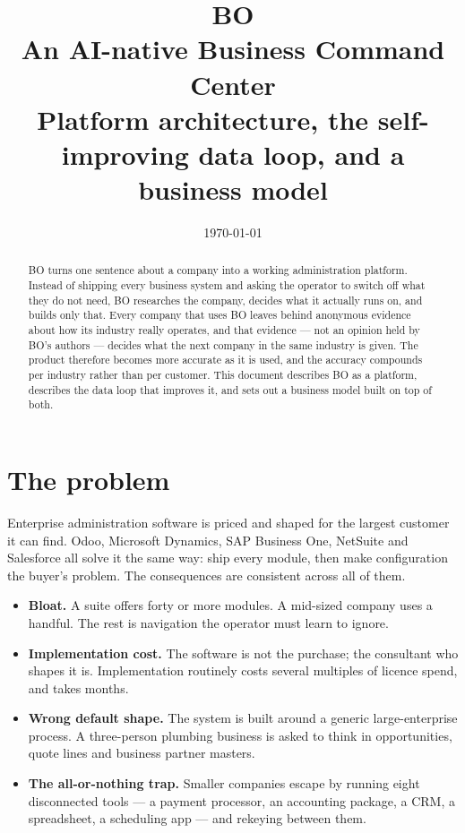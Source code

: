 \documentclass[11pt,a4paper]{article}
\title{\vspace{-1.5cm}\textbf{\Huge BO}\\[0.4em]
  \large An AI-native Business Command Center\\[0.25em]
  \normalsize\color{bomuted}Platform architecture, the self-improving data loop, and a business model}
\author{}
\date{\small\today}
\begin{document}
\maketitle
\thispagestyle{fancy}

\begin{abstract}
\noindent
BO turns one sentence about a company into a working administration platform. Instead of shipping
every business system and asking the operator to switch off what they do not need, BO researches the
company, decides what it actually runs on, and builds only that. Every company that uses BO leaves
behind anonymous evidence about how its industry really operates, and that evidence --- not an
opinion held by BO's authors --- decides what the next company in the same industry is given. The
product therefore becomes more accurate as it is used, and the accuracy compounds per industry
rather than per customer. This document describes BO as a platform, describes the data loop that
improves it, and sets out a business model built on top of both.
\end{abstract}

\section{The problem}

Enterprise administration software is priced and shaped for the largest customer it can find. Odoo,
Microsoft Dynamics, SAP Business One, NetSuite and Salesforce all solve it the same way: ship every
module, then make configuration the buyer's problem. The consequences are consistent across all of
them.

\begin{itemize}[leftmargin=1.4em,itemsep=2pt]
  \item \textbf{Bloat.} A suite offers forty or more modules. A mid-sized company uses a handful.
        The rest is navigation the operator must learn to ignore.
  \item \textbf{Implementation cost.} The software is not the purchase; the consultant who shapes it
        is. Implementation routinely costs several multiples of licence spend, and takes months.
  \item \textbf{Wrong default shape.} The system is built around a generic large-enterprise process.
        A three-person plumbing business is asked to think in opportunities, quote lines and business
        partner masters.
  \item \textbf{The all-or-nothing trap.} Smaller companies escape by running eight disconnected
        tools --- a payment processor, an accounting package, a CRM, a spreadsheet, a scheduling app
        --- and rekeying between them.
\end{itemize}
\end{document}
